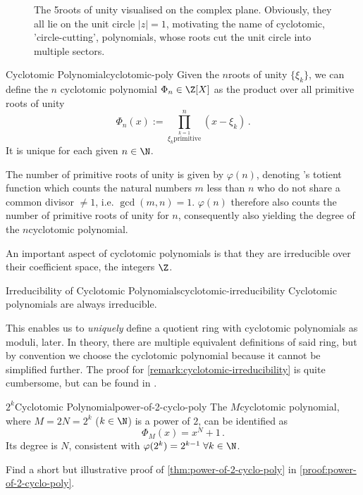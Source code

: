 \begin{figure}
  \centering
  \caption[The 5th roots of unity]{The 5\th roots of unity visualised on the complex plane. Obviously, they all lie on the unit circle $|z| = 1$, motivating the name of cyclotomic, 'circle-cutting', polynomials, whose roots cut the unit circle into multiple sectors.}
  \label{fig:nth-roots-of-unity}
\end{figure}

\begin{definition}{Cyclotomic Polynomial}{cyclotomic-poly}
  Given the $n$\th roots of unity $\{\xi_k\}$, we can define the $n$\th
  cyclotomic polynomial $\Phi_n \in \Z[X]$ as the product over all primitive roots of unity
  $$\Phi_n(x) := \prod_{\stackrel{k=1}{\xi_k \mathrm{primitive}}}^{n} (x - \xi_k) \,.$$
  It is unique for each given $n \in \N$.
\end{definition}
The number of primitive roots of unity is given by $\varphi(n)$, denoting 's totient function which counts the natural numbers $m$ less than $n$ who do not share a common divisor $\neq 1$, i.e. $\gcd(m, n) = 1$.
$\varphi(n)$ therefore also counts the number of primitive roots of unity for $n$, consequently also yielding the degree of the $n$\th cyclotomic polynomial.

An important aspect of cyclotomic polynomials is that they are irreducible over their coefficient space, the integers $\Z$.
\begin{remark}{Irreducibility of Cyclotomic Polynomials}{cyclotomic-irreducibility}
  Cyclotomic polynomials are always irreducible.
\end{remark}
This enables us to \textit{uniquely} define a quotient ring with cyclotomic polynomials as moduli, later.
In theory, there are multiple equivalent definitions of said ring, but by convention we choose the cyclotomic polynomial because it cannot be simplified further.
The proof for \cref{remark:cyclotomic-irreducibility} is quite cumbersome, but can be found in \cite{2002-serge-algebra}.

\begin{theorem}{$2^k$\th Cyclotomic Polynomial}{power-of-2-cyclo-poly}
  The $M$\th cyclotomic polynomial, where $M = 2N = 2^k$ ($k \in \N$) is a power of $2$, can be identified as
  $$\Phi_{M}(x) = x^{N} + 1\,.$$
  Its degree is $N$, consistent with $\varphi(2^k) = 2^{k-1} \; \forall k \in \N$.
\end{theorem}
Find a short but illustrative proof of \cref{thm:power-of-2-cyclo-poly} in \cref{proof:power-of-2-cyclo-poly}.

